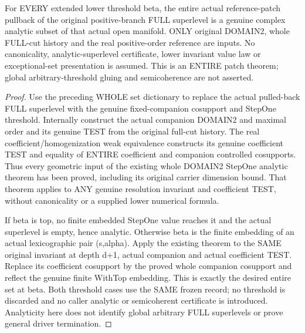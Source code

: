 \begin{theorem}
\label{hir:original-full-cut-frozen-companion-analytic-whole-superlevels}
\leanok
For EVERY extended lower threshold beta, the entire actual reference-patch
pullback of the original positive-branch FULL superlevel is a genuine
complex analytic subset of that actual open manifold. ONLY original DOMAIN2,
whole FULL-cut history and the real positive-order reference are inputs.
No canonicality, analytic-superlevel certificate, lower invariant value law
or exceptional-set presentation is assumed. This is an ENTIRE patch theorem;
global arbitrary-threshold gluing and semicoherence are not asserted.
\end{theorem}
\begin{proof}
Use the preceding WHOLE set dictionary to replace the actual pulled-back
FULL superlevel with the genuine fixed-companion cosupport and StepOne
threshold. Internally construct the actual companion DOMAIN2 and maximal
order and its genuine TEST from the original full-cut history. The real
coefficient/homogenization weak equivalence constructs its genuine
coefficient TEST and equality of ENTIRE coefficient and companion
controlled cosupports. Thus every geometric input of the existing whole
DOMAIN2 StepOne analytic theorem has been proved, including its original
carrier dimension bound. That theorem applies to ANY genuine resolution
invariant and coefficient TEST, without canonicality or a supplied lower
numerical formula.

If beta is top, no finite embedded StepOne value reaches it and the actual
superlevel is empty, hence analytic. Otherwise beta is the finite embedding
of an actual lexicographic pair (s,alpha). Apply the existing theorem to the
SAME original invariant at depth d+1, actual companion and actual coefficient
TEST. Replace its coefficient cosupport by the proved whole companion
cosupport and reflect the genuine finite WithTop embedding. This is exactly
the desired entire set at beta. Both threshold cases use the SAME frozen
record; no threshold is discarded and no caller analytic or semicoherent
certificate is introduced. Analyticity here does not identify global
arbitrary FULL superlevels or prove general driver termination.
\end{proof}
